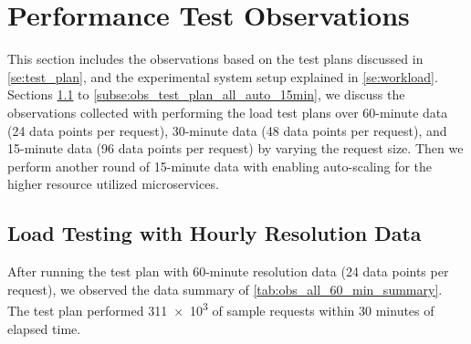 \section{Performance Test Observations}
\label{se:observations}

This section includes the observations based on the test plans discussed in \cref{se:test_plan}, and the experimental system setup explained in \cref{se:workload}. Sections \ref{subse:obs_test_plan_all_60min} to \ref{subse:obs_test_plan_all_auto_15min}, we discuss the observations collected with performing the load test plans over 60-minute data (24 data points per request), 30-minute data (48 data points per request), and 15-minute data (96 data points per request) by varying the request size. Then we perform another round of 15-minute data with enabling auto-scaling for the higher resource utilized microservices.

\subsection{Load Testing with Hourly Resolution Data}
\label{subse:obs_test_plan_all_60min}

After running the test plan with 60-minute resolution data (24 data points per request), we observed the data summary of \cref{tab:obs_all_60_min_summary}. The test plan performed \num{311e3} of sample requests within 30 minutes of elapsed time.

